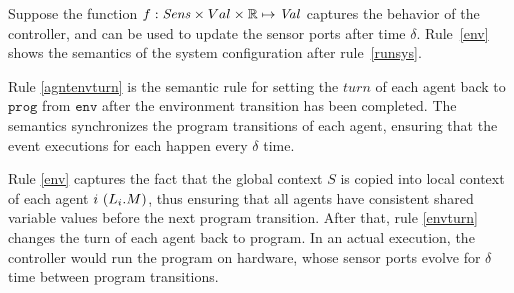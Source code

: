 Suppose the function $f:\mathit{Sens} \times Val \times \mathbb{R} \mapsto \mathit{Val}$ captures the behavior of the controller, and can be used to update the sensor ports after time $\delta$.
Rule~\ref{env} shows the semantics of the system configuration after rule~\ref{runsys}.

Rule \ref{agntenvturn} is the semantic rule for setting the $\mathit{turn}$ of each agent back to $\mathtt{prog}$ from $\mathtt{env}$ after the environment transition has been completed. The semantics synchronizes the program transitions of each agent, ensuring that the event executions for each happen every $\delta$ time.


Rule \ref{env} captures the fact that the global context $S$ is copied into local context of each agent $i \ (L_{i}.M)$, thus ensuring that all agents have consistent shared variable values before the next program transition. After that, rule \ref{envturn} changes the turn of each agent back to program. In an actual execution, the controller  would run the program on hardware, whose sensor ports evolve for $\delta$ time between program transitions.




